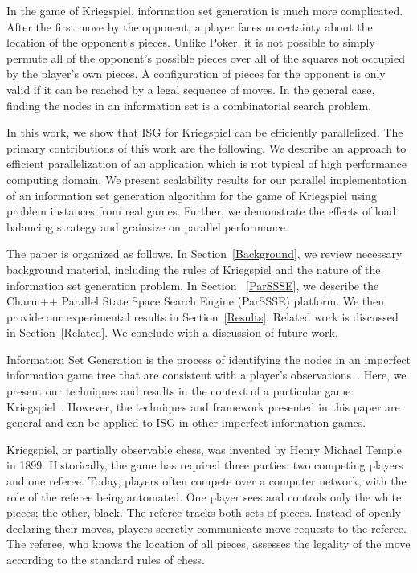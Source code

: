 \documentclass[times, 10pt,twocolumn]{article}
\begin{document}
In the game of Kriegspiel, information set generation is much more complicated.
After the first move by the opponent, a player faces uncertainty about the
location of the opponent's pieces.  Unlike Poker, it is not possible to simply
permute all of the opponent's possible pieces over all of the squares not
occupied by the player's own pieces.  A configuration of pieces for the
opponent is only valid if it can be reached by a legal sequence of moves.  In
the general case, finding the nodes in an information set is a combinatorial
search problem.

In this work, we show that ISG for Kriegspiel can be efficiently parallelized.
The primary contributions of this work are the following. We describe an
approach to efficient parallelization of an application which is not typical of
high performance computing domain. We present scalability results for our
parallel implementation of an information set generation algorithm for the game
of Kriegspiel using problem instances from real games. Further, we demonstrate
the effects of load balancing strategy and grainsize on parallel performance. 

The paper is organized as follows.  In Section~\ref{Background}, we review
necessary background material, including the rules of Kriegspiel and the nature
of the information set generation problem.  In Section ~\ref{ParSSSE}, we
describe the {\sc Charm++} Parallel State Space Search Engine (ParSSSE)
platform.  We then provide our experimental results in Section~\ref{Results}.
Related work is discussed in Section~\ref{Related}.  We conclude with a
discussion of future work.

Information Set Generation is the process of identifying the nodes in an
imperfect information game tree that are consistent with a player's
observations~\cite{richards12information}. Here, we present our techniques and
results in the context of a particular game: Kriegspiel~\cite{li94chess}.
However, the techniques and framework presented in this paper are general and
can be applied to ISG in other imperfect information games.

Kriegspiel, or partially observable chess,  was invented by Henry Michael
Temple in 1899.  Historically, the game has required three parties: two
competing players and one referee.  Today, players often compete over a
computer network, with the role of the referee being automated.  One player
sees and controls only the white pieces; the other, black.  The referee tracks
both sets of pieces.  Instead of openly declaring their moves, players secretly
communicate move requests to the referee.  The referee, who knows the location
of all pieces, assesses the legality of the move according to the standard
rules of chess.  
\end{document}
